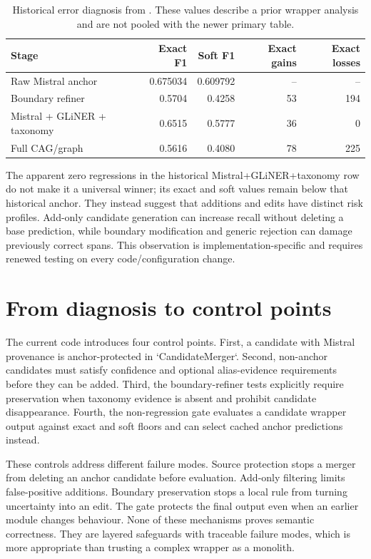 \begin{table}[H]
\centering
\small
\caption{Historical error diagnosis from . These values describe a prior wrapper analysis and are not pooled with the newer primary table.}
\label{tab:historical-errors}
\begin{tabular}{lrrrr}
\toprule
Stage & Exact F1 & Soft F1 & Exact gains & Exact losses \\
\midrule
Raw Mistral anchor & 0.675034 & 0.609792 & -- & -- \\
Boundary refiner & 0.5704 & 0.4258 & 53 & 194 \\
Mistral + GLiNER + taxonomy & 0.6515 & 0.5777 & 36 & 0 \\
Full CAG/graph & 0.5616 & 0.4080 & 78 & 225 \\
\bottomrule
\end{tabular}
\end{table}

The apparent zero regressions in the historical Mistral+GLiNER+taxonomy row do not make it a universal winner; its exact and soft values remain below that historical anchor. They instead suggest that additions and edits have distinct risk profiles. Add-only candidate generation can increase recall without deleting a base prediction, while boundary modification and generic rejection can damage previously correct spans. This observation is implementation-specific and requires renewed testing on every code/configuration change.

\section{From diagnosis to control points}

The current code introduces four control points. First, a candidate with Mistral provenance is anchor-protected in `CandidateMerger`. Second, non-anchor candidates must satisfy confidence and optional alias-evidence requirements before they can be added. Third, the boundary-refiner tests explicitly require preservation when taxonomy evidence is absent and prohibit candidate disappearance. Fourth, the non-regression gate evaluates a candidate wrapper output against exact and soft floors and can select cached anchor predictions instead.

These controls address different failure modes. Source protection stops a merger from deleting an anchor candidate before evaluation. Add-only filtering limits false-positive additions. Boundary preservation stops a local rule from turning uncertainty into an edit. The gate protects the final output even when an earlier module changes behaviour. None of these mechanisms proves semantic correctness. They are layered safeguards with traceable failure modes, which is more appropriate than trusting a complex wrapper as a monolith.

